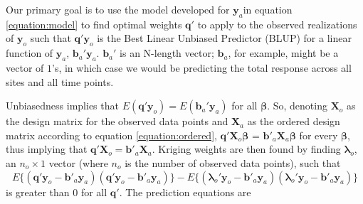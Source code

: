 \documentclass[]{interact}
\theoremstyle{plain}%
\theoremstyle{definition}
\theoremstyle{remark}
\begin{document}
Our primary goal is to use the model developed for \(\mathbf{y}_a\)in
equation \ref{equation:model} to find optimal weights \(\mathbf{q}'\) to
apply to the observed realizations of \(\mathbf{y}_o\) such that
\(\mathbf{q}' \mathbf{y}_o\) is the Best Linear Unbiased Predictor
(BLUP) for a linear function of \(\mathbf{y}_a\),
\(\mathbf{b}_a' \mathbf{y}_a\). \(\mathbf{b}_a'\) is an N-length vector;
\(\mathbf{b}_a\), for example, might be a vector of \(1\)'s, in which
case we would be predicting the total response across all sites and all
time points.

Unbiasedness implies that
\(E(\mathbf{q'}\mathbf{y}_o) = E(\mathbf{b}_a'\mathbf{y}_a)\) for all
\(\bm{\beta}\). So, denoting \(\mathbf{X}_o\) as the design matrix for
the observed data points and \(\mathbf{X}_a\) as the ordered design
matrix according to equation \ref{equation:ordered},
\(\mathbf{q'} \mathbf{X}_o \bm{\beta}\) =
\(\mathbf{b'}_a \mathbf{X}_a \bm{\beta}\) for every \(\bm{\beta}\), thus
implying that \(\mathbf{q'} \mathbf{X}_o = \mathbf{b'}_a \mathbf{X}_a\).
Kriging weights are then found by finding \(\bm{\lambda}_o\), an
\(n_o \times 1\) vector (where \(n_o\) is the number of observed data
points), such that \mbox{} \begin{equation}
E\{(\mathbf{q'}\mathbf{y}_o - \mathbf{b'}_a \mathbf{y}_a)(\mathbf{q'}\mathbf{y}_o - \mathbf{b'}_a \mathbf{y}_a)\} - E\{(\bm{\lambda}_o'\mathbf{y}_o - \mathbf{b'}_a \mathbf{y}_a)(\bm{\lambda}_o'\mathbf{y}_o - \mathbf{b'}_a \mathbf{y}_a)\}
\end{equation} \noindent is greater than 0 for all \(\mathbf{q'}\). The
prediction equations are
\end{document}
